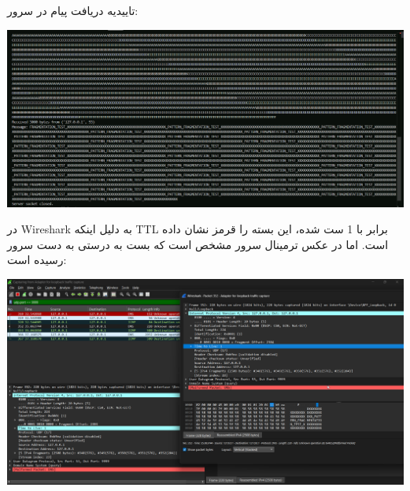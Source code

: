 تاییدیه دریافت پیام در سرور:

\begin{center}
	\includegraphics[width=0.8\linewidth]{screenshot004}
\end{center}


در Wireshark به دلیل اینکه TTL برابر با 1 ست شده، این بسته را قرمز نشان داده است. اما در عکس ترمینال سرور مشخص است که بست به درستی به دست سرور رسیده است:

\begin{center}
	\includegraphics[width=1\linewidth]{screenshot005}
\end{center}
